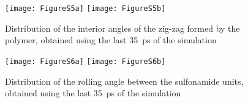 \documentclass[12pt,a4paper]{article}
\begin{document}
\begin{figure}[!h]
\centering
\texttt{[image: FigureS5a]}
\texttt{[image: FigureS5b]}
\caption{Distribution of the interior angles of the zig-zag formed by the polymer,  obtained using the last \SI{35}{\pico\second} of the simulation}
\end{figure}

\begin{figure}[!h]
\centering
\texttt{[image: FigureS6a]}
\texttt{[image: FigureS6b]}
\caption{Distribution of the rolling angle between the sulfonamide units,  obtained using the last \SI{35}{\pico\second} of the simulation}
\end{figure}
	
\end{document}
